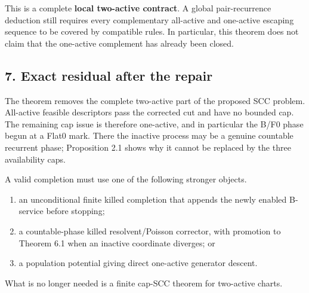 This is a complete \textbf{local two-active contract}. A global
pair-recurrence deduction still requires every complementary all-active
and one-active escaping sequence to be covered by compatible rules. In
particular, this theorem does not claim that the one-active complement
has already been closed.

\subsection{7. Exact residual after the
repair}

The theorem removes the complete two-active part of the proposed SCC
problem. All-active feasible descriptors pass the corrected cut and have
no bounded cap. The remaining cap issue is therefore one-active, and in
particular the B/F0 phase begun at a Flat0 mark. There the inactive
process may be a genuine countable recurrent phase; Proposition 2.1
shows why it cannot be replaced by the three availability caps.

A valid completion must use one of the following stronger objects.

\begin{enumerate}
\def\labelenumi{\arabic{enumi}.}
\tightlist
\item
  an unconditional finite killed completion that appends the newly
  enabled B-service before stopping;
\item
  a countable-phase killed resolvent/Poisson corrector, with promotion
  to Theorem 6.1 when an inactive coordinate diverges; or
\item
  a population potential giving direct one-active generator descent.
\end{enumerate}

What is no longer needed is a finite cap-SCC theorem for two-active
charts.
